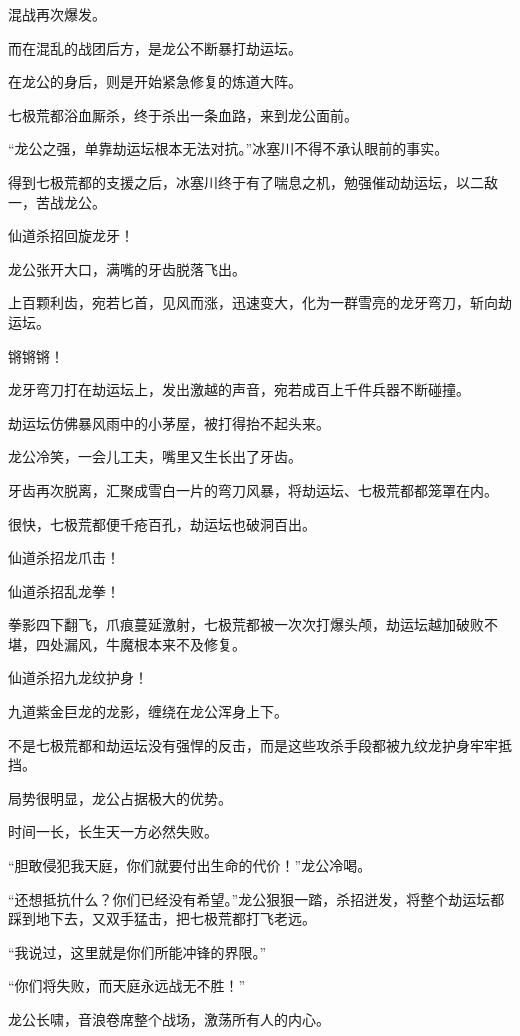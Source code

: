 \begin{this_body}
混战再次爆发。

而在混乱的战团后方，是龙公不断暴打劫运坛。

在龙公的身后，则是开始紧急修复的炼道大阵。

七极荒都浴血厮杀，终于杀出一条血路，来到龙公面前。

“龙公之强，单靠劫运坛根本无法对抗。”冰塞川不得不承认眼前的事实。

得到七极荒都的支援之后，冰塞川终于有了喘息之机，勉强催动劫运坛，以二敌一，苦战龙公。

仙道杀招回旋龙牙！

龙公张开大口，满嘴的牙齿脱落飞出。

上百颗利齿，宛若匕首，见风而涨，迅速变大，化为一群雪亮的龙牙弯刀，斩向劫运坛。

锵锵锵！

龙牙弯刀打在劫运坛上，发出激越的声音，宛若成百上千件兵器不断碰撞。

劫运坛仿佛暴风雨中的小茅屋，被打得抬不起头来。

龙公冷笑，一会儿工夫，嘴里又生长出了牙齿。

牙齿再次脱离，汇聚成雪白一片的弯刀风暴，将劫运坛、七极荒都都笼罩在内。

很快，七极荒都便千疮百孔，劫运坛也破洞百出。

仙道杀招龙爪击！

仙道杀招乱龙拳！

拳影四下翻飞，爪痕蔓延激射，七极荒都被一次次打爆头颅，劫运坛越加破败不堪，四处漏风，牛魔根本来不及修复。

仙道杀招九龙纹护身！

九道紫金巨龙的龙影，缠绕在龙公浑身上下。

不是七极荒都和劫运坛没有强悍的反击，而是这些攻杀手段都被九纹龙护身牢牢抵挡。

局势很明显，龙公占据极大的优势。

时间一长，长生天一方必然失败。

“胆敢侵犯我天庭，你们就要付出生命的代价！”龙公冷喝。

“还想抵抗什么？你们已经没有希望。”龙公狠狠一踏，杀招迸发，将整个劫运坛都踩到地下去，又双手猛击，把七极荒都打飞老远。

“我说过，这里就是你们所能冲锋的界限。”

“你们将失败，而天庭永远战无不胜！”

龙公长啸，音浪卷席整个战场，激荡所有人的内心。


\end{this_body}
